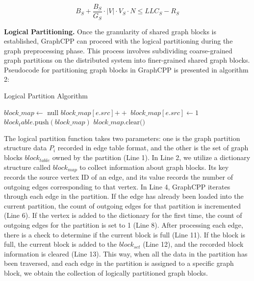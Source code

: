 \documentclass[lettersize,journal]{IEEEtran} %
\begin{document}
\begin{equation}
    B_S + \frac{B_S}{G_S} \cdot \lvert V \rvert \cdot V_S \cdot N \leq LLC_S - R_S
    \end{equation}

{\bf{Logical Partitioning.}} Once the granularity of shared graph blocks is established, GraphCPP can proceed with the logical partitioning during the graph preprocessing phase. This process involves subdividing coarse-grained graph partitions on the distributed system into finer-grained shared graph blocks. Pseudocode for partitioning graph blocks in GraphCPP is presented in algorithm 2:

\begin{algorithm}
\caption{Logical Partition Algorithm}
\begin{algorithmic}[1]
    \State $block\_map \gets$ null
            \State $block\_map[e.src] \mathrel{+{+}}$
        \Else
            \State $block\_map[e.src] \gets 1$
        \EndIf
            \State $block_table.\text{push}(block\_map)$
            \State $block\_map.\text{clear()}$
        \EndIf
    \EndFor
\EndFunction
\end{algorithmic}
\end{algorithm}

The logical partition function takes two parameters: one is the graph partition structure data $P_i$ recorded in edge table format, and the other is the set of graph blocks $block_{table}$ owned by the partition (Line 1). In Line 2, we utilize a dictionary structure called $block_{map}$ to collect information about graph blocks. Its key records the source vertex ID of an edge, and its value records the number of outgoing edges corresponding to that vertex. In Line 4, GraphCPP iterates through each edge in the partition. If the edge has already been loaded into the current partition, the count of outgoing edges for that partition is incremented (Line 6). If the vertex is added to the dictionary for the first time, the count of outgoing edges for the partition is set to 1 (Line 8). After processing each edge, there is a check to determine if the current block is full (Line 11). If the block is full, the current block is added to the $block_{set}$ (Line 12), and the recorded block information is cleared (Line 13). This way, when all the data in the partition has been traversed, and each edge in the partition is assigned to a specific graph block, we obtain the collection of logically partitioned graph blocks.
\end{document}
